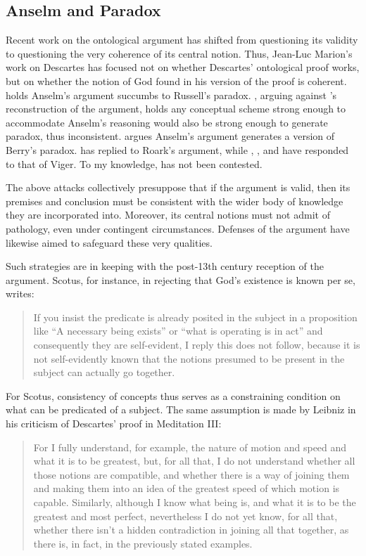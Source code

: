 \documentclass[]{amsart}
\begin{document}
\subsection{Anselm and Paradox}
Recent work on the ontological argument has shifted from questioning its validity to questioning the very coherence of its central notion. Thus, Jean-Luc Marion's work on Descartes has focused not on whether Descartes' ontological proof works, but on whether the notion of God found in his version of the proof is coherent. \cite{Viger2002} holds Anselm's argument succumbs to Russell's paradox. \cite{Roark2003}, arguing against \cite{Klima2000}'s reconstruction of the argument, holds any conceptual scheme strong enough to accommodate Anselm's reasoning would also be strong enough to generate paradox, thus inconsistent. \cite{Schlenker2009} argues Anselm's argument generates a version of Berry's paradox. \cite{Klima2003} has replied to Roark's argument, while \cite{Nowicki2006}, \cite{Neuhaus2007}, and \cite{Uckelman2010} have responded to that of Viger. To my knowledge, \cite{Schlenker2009} has not been contested.

The above attacks collectively presuppose that if the argument is valid, then its premises and conclusion must be consistent with the wider body of knowledge they are incorporated into. Moreover, its central notions must not admit of pathology, even under contingent circumstances. Defenses of the argument have likewise aimed to safeguard these very qualities.

Such strategies are in keeping with the post-13th century reception of the argument. Scotus, for instance, in rejecting that God's existence is known per se, writes:

\begin{quote}
If you insist the predicate is already posited in the subject in a proposition like “A necessary being exists” or “what is operating is in act” and consequently they are self-evident, I reply this does not follow, because it is not self-evidently known that the notions presumed to be present in the subject can actually go together. \cite[166]{Scotus1966}
\end{quote}

For Scotus, consistency of concepts thus serves as a constraining condition on what can be predicated of a subject. The same assumption is made by Leibniz in his criticism of Descartes' proof in Meditation III:

\begin{quote}
For I fully understand, for example, the nature of motion and speed and what it is to be greatest, but, for all that, I do not understand whether all those notions are compatible, and whether there is a way of joining them and making them into an idea of the greatest speed of which motion is capable. Similarly, although I know what being is, and what it is to be the greatest and most perfect, nevertheless I do not yet know, for all that, whether there isn't a hidden contradiction in joining all that together, as there is, in fact, in the previously stated examples. \cite[238]{AG}
\end{quote}
\end{document}
